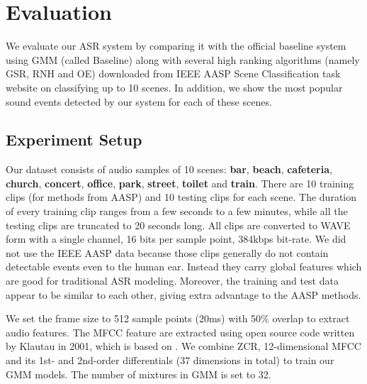 \section{Evaluation}
\label{sec:eval}
We evaluate our ASR system by comparing it with the official
baseline system using GMM (called Baseline) along with several
high ranking algorithms (namely GSR, RNH and OE) downloaded from IEEE AASP 
Scene Classification task website\cite{6701819} 
on classifying up to 10 scenes.
In addition, we show the most popular sound events detected by our system
for each of these scenes.

\subsection{Experiment Setup}
Our dataset consists of audio samples of 10 scenes:
{\bf bar}, {\bf beach}, {\bf cafeteria}, {\bf church},
{\bf concert}, {\bf office}, {\bf park}, {\bf street},
{\bf toilet} and {\bf train}.
There are 10 training clips (for methods from AASP) 
and 10 testing clips for each scene.
The duration of every
training clip ranges from a few seconds to a few minutes, while all the
testing clips are truncated to 20 seconds long.
All clips are converted to WAVE form with a single channel,
16 bits per sample point, 384kbps bit-rate.
We did not use the IEEE AASP data because those clips generally
do not contain detectable events even to the human ear. Instead they
carry global features which are good for traditional ASR modeling.
Moreover, the training and test data appear to be similar to each other,
giving extra advantage to the AASP methods.

We set the frame size to 512 sample points (20ms) with 50\% overlap
to extract audio features.
The MFCC feature are extracted using open source code written by Klautau
in 2001, which is based on \cite{1163420,237532}.
We combine ZCR, 12-dimensional MFCC
and its 1st- and 2nd-order differentials (37 dimensions in total)
to train our GMM models. The number of mixtures in GMM is set to 32.

